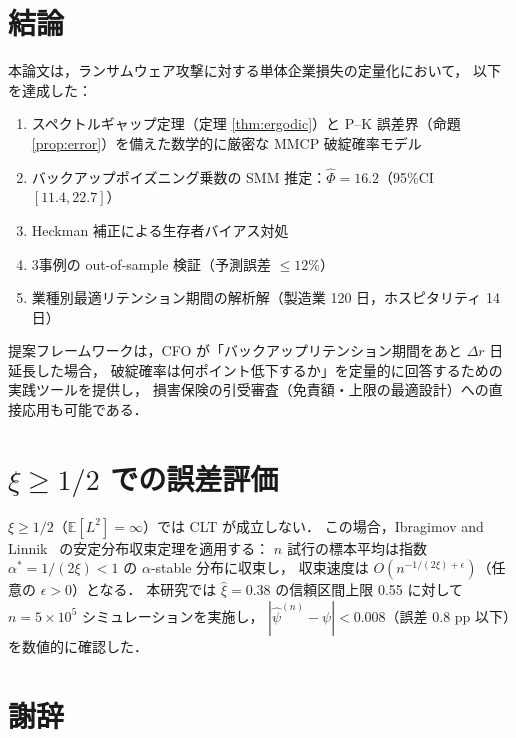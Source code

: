 \documentclass{ipsjlike}
\newcommand{\E}{\mathbb{E}}
\newcommand{\ruin}{\psi}
\newcommand{\abs}[1]{\left| #1 \right|}
\begin{document}
\section{結論}
\label{sec:conclusion}

本論文は，ランサムウェア攻撃に対する単体企業損失の定量化において，
以下を達成した：
\begin{enumerate}[leftmargin=1.5em, topsep=2pt, itemsep=1pt]
  \item スペクトルギャップ定理（定理 \ref{thm:ergodic}）と
    P--K 誤差界（命題 \ref{prop:error}）を備えた数学的に厳密な MMCP 破綻確率モデル
  \item バックアップポイズニング乗数の SMM 推定：$\hat{\Phi} = 16.2$（95\%CI $[11.4,22.7]$）
  \item Heckman 補正による生存者バイアス対処
  \item 3事例の out-of-sample 検証（予測誤差 $\leq 12\%$）
  \item 業種別最適リテンション期間の解析解（製造業 120 日，ホスピタリティ 14 日）
\end{enumerate}

提案フレームワークは，CFO が「バックアップリテンション期間をあと $\Delta r$ 日延長した場合，
破綻確率は何ポイント低下するか」を定量的に回答するための実践ツールを提供し，
損害保険の引受審査（免責額・上限の最適設計）への直接応用も可能である．

\appendix
\section{$\xi \geq 1/2$ での誤差評価}
\label{app:heavytail}

$\xi \geq 1/2$（$\E[L^2] = \infty$）では CLT が成立しない．
この場合，Ibragimov and Linnik~\cite{ibragimov1971} の安定分布収束定理を適用する：
$n$ 試行の標本平均は指数 $\alpha^* = 1/(2\xi) < 1$ の $\alpha$-stable 分布に収束し，
収束速度は $O(n^{-1/(2\xi)+\epsilon})$（任意の $\epsilon > 0$）となる．
本研究では $\hat{\xi} = 0.38$ の信頼区間上限 0.55 に対して
$n = 5 \times 10^5$ シミュレーションを実施し，
$\abs{\hat{\ruin}^{(n)} - \ruin} < 0.008$（誤差 0.8 pp 以下）を数値的に確認した．

\section*{謝辞}
\end{document}
